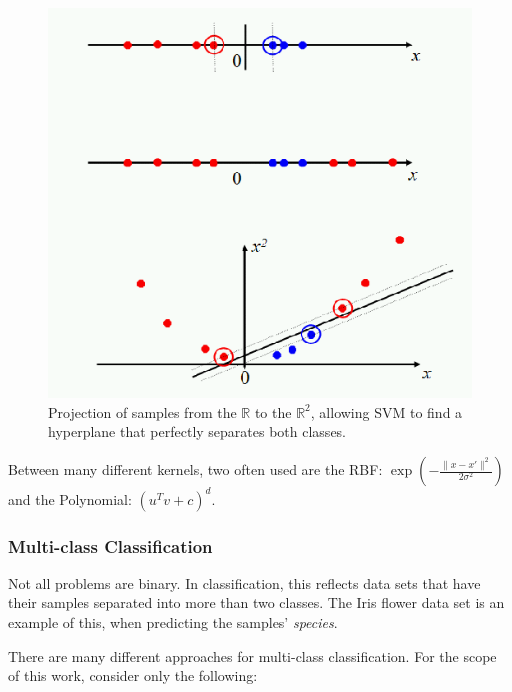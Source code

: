 \documentclass[12pt]{article}
\begin{document}
\begin{figure}[H]
	\centering
	\captionsetup{justification=centering}

	\includegraphics[scale=.4]{svm_kernel}
	\caption{Projection of samples from the $\mathbb{R}$ to the $\mathbb{R}^2$, allowing SVM to find a hyperplane that perfectly separates both classes. \cite{svmkernels}}
	\label{fig:svmkernel}
\end{figure}

Between many different kernels, two often used are the RBF: $\exp(-\frac{\|x -x'\|^2}{2\sigma^2})$ and the Polynomial: $(u^T v + c)^{d}$. \cite{svmkernels}

\subsubsection{Multi-class Classification}

Not all problems are binary. In classification, this reflects data sets that have their samples separated into more than two classes. The Iris flower data set is an example of this, when predicting the samples' {\em species}.

There are many different approaches for multi-class classification. \cite{rif2008} For the scope of this work, consider only the following:
\end{document}
